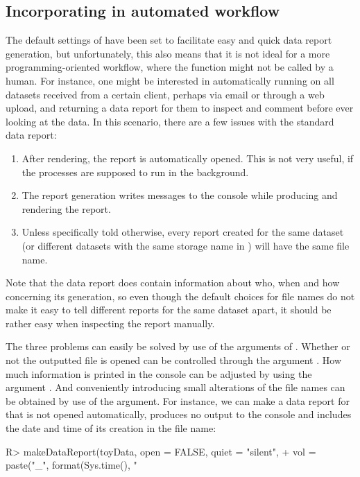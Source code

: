 \documentclass[article,shortnames]{jss}
\begin{document}
\subsection[Incorporating dataMaid in an automated workflow]{Incorporating  in automated workflow}
The default settings of  have been set to facilitate easy and quick data report generation, but unfortunately, this also means that it is not ideal for a more programming-oriented workflow, where the function might not be called by a human. For instance, one might be interested in automatically running  on all datasets received from a certain client, perhaps via email or through a web upload, and returning a data report for them to inspect and comment before ever looking at the data. In this scenario, there are a few issues with the standard data report:
\begin{enumerate}
\item After rendering, the report is automatically opened. This is not very useful, if the processes are supposed to run in the background.
\item The report generation writes messages to the console while producing and rendering the report.
\item Unless specifically told otherwise, every report created for the same dataset (or different datasets with the same storage name in ) will have the same file name.
\end{enumerate}
Note that the data report does contain information about who, when and how concerning its generation, so even though the default choices for file names do not make it easy to tell different reports for the same dataset apart, it should be rather easy when inspecting the report manually. 

The three problems can easily be solved by use of the arguments of . Whether or not the outputted file is opened can be controlled through the argument . How much information is printed in the console can be adjusted by using the argument . And conveniently introducing small alterations of the file names can be obtained by use of the  argument. For instance, we can make a data report for  that is not opened automatically, produces no output to the console and includes the date and time of its creation in the file name:

\begin{Schunk}
\begin{Sinput}
R> makeDataReport(toyData, open = FALSE, quiet = "silent",
+    vol = paste("_", format(Sys.time(), "%
\end{Sinput}
\end{Schunk}
\end{document}
